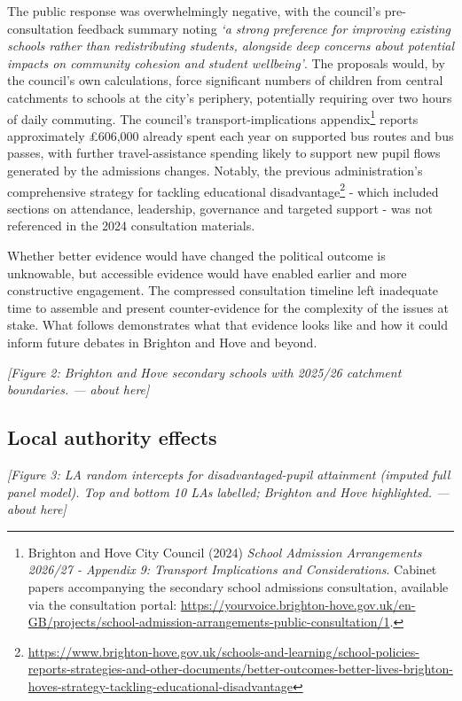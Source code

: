 \documentclass[
  12pt,
  titlepage]{article}
\begin{document}
The public response was overwhelmingly negative, with the council's
pre-consultation feedback summary noting \emph{`a strong preference for
improving existing schools rather than redistributing students,
alongside deep concerns about potential impacts on community cohesion
and student wellbeing'}. The proposals would, by the council's own
calculations, force significant numbers of children from central
catchments to schools at the city's periphery, potentially requiring
over two hours of daily commuting. The council's transport-implications
appendix\footnote{Brighton and Hove City Council (2024) \emph{School
  Admission Arrangements 2026/27 - Appendix 9: Transport Implications
  and Considerations}. Cabinet papers accompanying the secondary school
  admissions consultation, available via the consultation portal:
  \url{https://yourvoice.brighton-hove.gov.uk/en-GB/projects/school-admission-arrangements-public-consultation/1}.}
reports approximately £606,000 already spent each year on supported bus
routes and bus passes, with further travel-assistance spending likely to
support new pupil flows generated by the admissions changes. Notably,
the previous administration's comprehensive strategy for tackling
educational disadvantage\footnote{\url{https://www.brighton-hove.gov.uk/schools-and-learning/school-policies-reports-strategies-and-other-documents/better-outcomes-better-lives-brighton-hoves-strategy-tackling-educational-disadvantage}}
- which included sections on attendance, leadership, governance and
targeted support - was not referenced in the 2024 consultation
materials.

Whether better evidence would have changed the political outcome is
unknowable, but accessible evidence would have enabled earlier and more
constructive engagement. The compressed consultation timeline left
inadequate time to assemble and present counter-evidence for the
complexity of the issues at stake. What follows demonstrates what that
evidence looks like and how it could inform future debates in Brighton
and Hove and beyond.

\emph{{[}Figure 2: Brighton and Hove secondary schools with 2025/26
catchment boundaries. --- about here{]}}

\subsection{Local authority effects}\label{local-authority-effects}

\emph{{[}Figure 3: LA random intercepts for disadvantaged-pupil
attainment (imputed full panel model). Top and bottom 10 LAs labelled;
Brighton and Hove highlighted. --- about here{]}}
\end{document}
